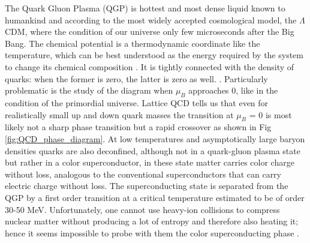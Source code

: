 \documentclass[12pt,a4paper]{book}
\begin{document}
	The Quark Gluon Plasma (QGP) is hottest and most dense liquid known to humankind and according to the most widely accepted cosmological model, the $\Lambda$CDM, where the condition of our universe only few microseconds after the Big Bang. The chemical potential is a thermodynamic coordinate like the temperature, which can be best understood as the energy required by the system to change its chemical composition . It is tightly connected with the density of quarks: when the former is zero, the latter is zero as well. \cite{QCDPhase-Diagram}. Particularly problematic is the study of the diagram when $\mu_B$ approaches 0, like in the condition of the primordial universe. Lattice QCD tells us that even for realistically small up and down quark masses the transition at $\mu_B$ = 0 is most likely not a sharp phase transition but a rapid crossover as shown in Fig \ref{fig:QCD_phase_diagram}.  At low temperatures and asymptotically large baryon densities quarks are also deconfined, although not in a quark-gluon plasma state but rather in a
	color superconductor, in these state matter carries color charge without loss, analogous to the conventional superconductors that can carry electric charge without loss. The superconducting state is separated from the QGP by a first order transition at a critical temperature estimated to be of order 30-50 MeV.  Unfortunately, one cannot use heavy-ion collisions to compress nuclear matter without producing a lot of entropy and therefore also heating it; hence it seems impossible to probe with them the color superconducting phase \cite{heinz2004conceptsheavyionphysics}.
	
\end{document}
